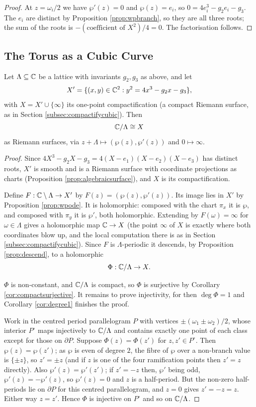 \documentclass[a4paper]{scrartcl}
\begin{document}
\begin{proof}
	At $z = \omega_i/2$ we have $\wp'(z) = 0$ and $\wp(z) = e_i$, so
	$0 = 4e_i^3 - g_2e_i - g_3$. The $e_i$ are distinct by Proposition \ref{prop:wpbranch},
	so they are all three roots; the sum of the roots is $-(\text{coefficient of }X^2)/4 = 0$.
	The factorisation follows.
\end{proof}

\subsection{The Torus as a Cubic Curve}

\begin{theorem}\label{thm:toruscubic}
	Let $\Lambda\subseteq\mathbb{C}$ be a lattice with invariants $g_2, g_3$ as above, and let
	$$
	X' = \{(x,y)\in\mathbb{C}^2 : y^2 = 4x^3-g_2x-g_3\},
	$$
	with $X = X'\cup\{\infty\}$ its one-point compactification (a compact Riemann surface,
	as in Section \ref{subsec:compactifycubic}). Then
	$$
	\mathbb{C}/\Lambda \cong X
	$$
	as Riemann surfaces, via $z + \Lambda \mapsto (\wp(z),\wp'(z))$ and $0 \mapsto \infty$.
\end{theorem}

\begin{proof}
	Since $4X^3-g_2X-g_3 = 4(X-e_1)(X-e_2)(X-e_3)$ has distinct roots, $X'$ is smooth and
	is a Riemann surface with coordinate projections as charts (Proposition
	\ref{prop:algebraicsurface}), and $X$ is its compactification.

	Define $F : \mathbb{C}\setminus\Lambda \to X'$ by $F(z) = (\wp(z),\wp'(z))$. Its image lies in
	$X'$ by Proposition \ref{prop:wpode}. It is holomorphic: composed with the chart
	$\pi_x$ it is $\wp$, and composed with $\pi_y$ it is $\wp'$, both holomorphic. Extending
	by $F(\omega)=\infty$ for $\omega \in \Lambda$ gives a holomorphic map $\mathbb{C} \to X$ (the
	point $\infty$ of $X$ is exactly where both coordinates blow up, and the local
	computation there is as in Section \ref{subsec:compactifycubic}). Since $F$ is
	$\Lambda$-periodic it descends, by Proposition \ref{prop:descend}, to a holomorphic
	$$
	\Phi : \mathbb{C}/\Lambda \to X.
	$$

	$\Phi$ is non-constant, and $\mathbb{C}/\Lambda$ is compact, so $\Phi$ is surjective by
	Corollary \ref{cor:compactsurjective}. It remains to prove injectivity, for then
	$\deg\Phi = 1$ and Corollary \ref{cor:degree1} finishes the proof.

	Work in the centred period parallelogram $P$ with vertices $\pm(\omega_1\pm\omega_2)/2$,
	whose interior $P^\circ$ maps injectively to $\mathbb{C}/\Lambda$ and contains exactly one
	point of each class except for those on $\partial P$. Suppose $\Phi(z)=\Phi(z')$ for
	$z,z' \in P^\circ$. Then $\wp(z)=\wp(z')$; as $\wp$ is even of degree $2$, the fibre of
	$\wp$ over a non-branch value is $\{\pm z\}$, so $z' = \pm z$ (and if $z$ is one of the
	four ramification points then $z'=z$ directly). Also $\wp'(z)=\wp'(z')$; if $z'=-z$
	then, $\wp'$ being odd, $\wp'(z) = -\wp'(z)$, so $\wp'(z)=0$ and $z$ is a half-period.
	But the non-zero half-periods lie on $\partial P$ for this centred parallelogram, and
	$z = 0$ gives $z' = -z = z$. Either way $z=z'$. Hence $\Phi$ is injective on $P^\circ$
	and so on $\mathbb{C}/\Lambda$.
\end{proof}
\end{document}
